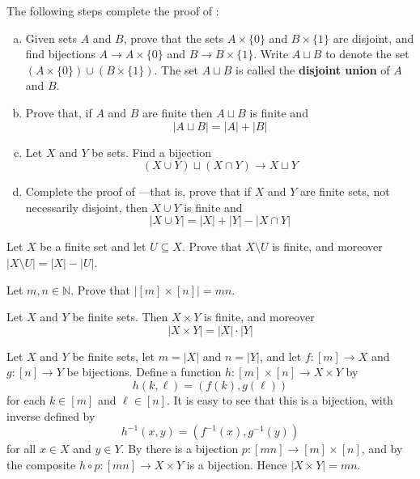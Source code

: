 \begin{exercise}
\label{exSizeOfUnion}
The following steps complete the proof of :
\begin{enumerate}[(a)]
\item Given sets $A$ and $B$, prove that the sets $A \times \{ 0 \}$ and $B \times \{ 1 \}$ are disjoint, and find bijections $A \to A \times \{ 0 \}$ and $B \to B \times \{ 1 \}$. Write $A \sqcup B$  to denote the set $(A \times \{ 0 \}) \cup (B \times \{ 1 \})$. The set $A \sqcup B$ is called the \textbf{disjoint union} of $A$ and $B$.
\item Prove that, if $A$ and $B$ are finite then $A \sqcup B$ is finite and
\[ |A \sqcup B| = |A| + |B| \]
\item Let $X$ and $Y$ be sets. Find a bijection
\[ (X \cup Y) \sqcup (X \cap Y) \to X \sqcup Y \]
\item Complete the proof of ---that is, prove that if $X$ and $Y$ are finite sets, not necessarily disjoint, then $X \cup Y$ is finite and
\[ |X \cup Y| = |X| + |Y| - |X \cap Y| \]
\end{enumerate}
\end{exercise}

\begin{exercise}
Let $X$ be a finite set and let $U \subseteq X$. Prove that $X \setminus U$ is finite, and moreover $|X \setminus U| = |X| - |U|$.
\end{exercise}

\begin{exercise}
\label{exSizeOfCartesianProduct}
Let $m,n \in \mathbb{N}$. Prove that $|[m] \times [n]| = mn$.
\end{exercise}

\begin{proposition}
\label{propProductOfFiniteSetsIsFinite}
Let $X$ and $Y$ be finite sets. Then $X \times Y$ is finite, and moreover
\[ |X \times Y| = |X| \cdot |Y| \]
\end{proposition}
\begin{cproof}
Let $X$ and $Y$ be finite sets, let $m=|X|$ and $n=|Y|$, and let $f : [m] \to X$ and $g : [n] \to Y$ be bijections. Define a function $h : [m] \times [n] \to X \times Y$ by
\[ h(k,\ell) = (f(k),g(\ell)) \]
for each $k \in [m]$ and $\ell \in [n]$. It is easy to see that this is a bijection, with inverse defined by
\[ h^{-1}(x,y) = (f^{-1}(x), g^{-1}(y)) \]
for all $x \in X$ and $y \in Y$. By  there is a bijection $p : [mn] \to [m] \times [n]$, and by  the composite $h \circ p : [mn] \to X \times Y$ is a bijection. Hence $|X \times Y| = mn$.
\end{cproof}

